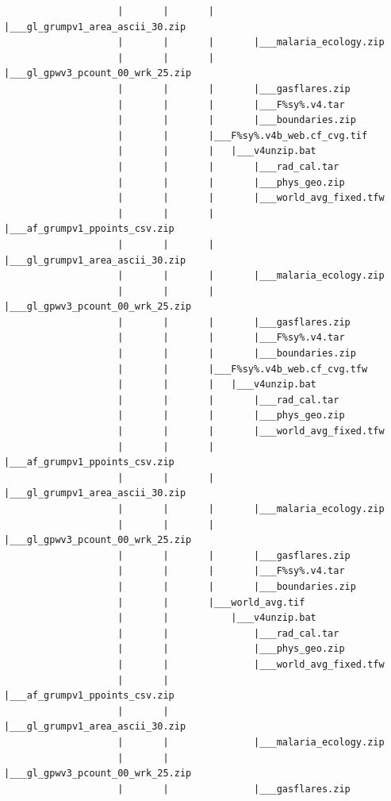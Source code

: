 \documentclass[
]{book}
\begin{document}
\begin{verbatim}
                    |       |       |       |___gl_grumpv1_area_ascii_30.zip
                    |       |       |       |___malaria_ecology.zip
                    |       |       |       |___gl_gpwv3_pcount_00_wrk_25.zip
                    |       |       |       |___gasflares.zip
                    |       |       |       |___F%sy%.v4.tar
                    |       |       |       |___boundaries.zip
                    |       |       |___F%sy%.v4b_web.cf_cvg.tif
                    |       |       |   |___v4unzip.bat
                    |       |       |       |___rad_cal.tar
                    |       |       |       |___phys_geo.zip
                    |       |       |       |___world_avg_fixed.tfw
                    |       |       |       |___af_grumpv1_ppoints_csv.zip
                    |       |       |       |___gl_grumpv1_area_ascii_30.zip
                    |       |       |       |___malaria_ecology.zip
                    |       |       |       |___gl_gpwv3_pcount_00_wrk_25.zip
                    |       |       |       |___gasflares.zip
                    |       |       |       |___F%sy%.v4.tar
                    |       |       |       |___boundaries.zip
                    |       |       |___F%sy%.v4b_web.cf_cvg.tfw
                    |       |       |   |___v4unzip.bat
                    |       |       |       |___rad_cal.tar
                    |       |       |       |___phys_geo.zip
                    |       |       |       |___world_avg_fixed.tfw
                    |       |       |       |___af_grumpv1_ppoints_csv.zip
                    |       |       |       |___gl_grumpv1_area_ascii_30.zip
                    |       |       |       |___malaria_ecology.zip
                    |       |       |       |___gl_gpwv3_pcount_00_wrk_25.zip
                    |       |       |       |___gasflares.zip
                    |       |       |       |___F%sy%.v4.tar
                    |       |       |       |___boundaries.zip
                    |       |       |___world_avg.tif
                    |       |           |___v4unzip.bat
                    |       |               |___rad_cal.tar
                    |       |               |___phys_geo.zip
                    |       |               |___world_avg_fixed.tfw
                    |       |               |___af_grumpv1_ppoints_csv.zip
                    |       |               |___gl_grumpv1_area_ascii_30.zip
                    |       |               |___malaria_ecology.zip
                    |       |               |___gl_gpwv3_pcount_00_wrk_25.zip
                    |       |               |___gasflares.zip

\end{verbatim}
\end{document}

